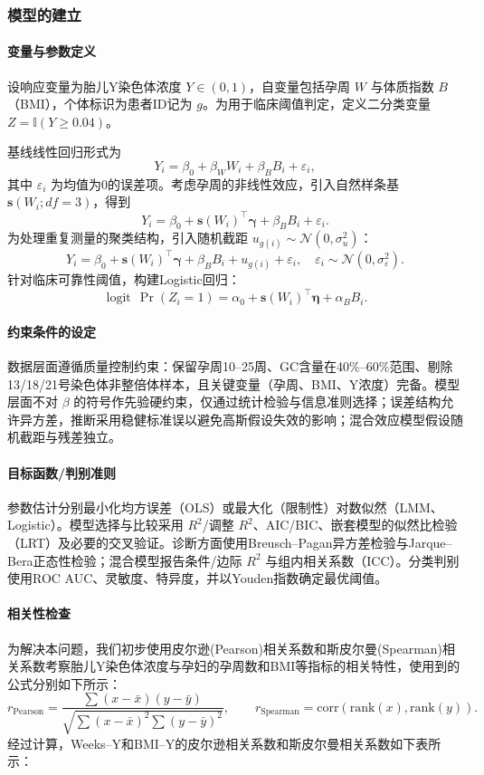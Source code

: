 \documentclass[withoutpreface]{cumcmthesis}
\begin{document}
\subsubsection{模型的建立}
\paragraph{变量与参数定义}
设响应变量为胎儿Y染色体浓度 $Y\in(0,1)$，自变量包括孕周 $W$ 与体质指数 $B$（BMI），个体标识为患者ID记为 $g$。为用于临床阈值判定，定义二分类变量 $Z=\mathbb{I}(Y\ge 0.04)$。

基线线性回归形式为
\[
Y_i=\beta_0+\beta_W W_i+\beta_B B_i+\varepsilon_i,
\]
其中 $\varepsilon_i$ 为均值为0的误差项。考虑孕周的非线性效应，引入自然样条基 $\mathbf{s}(W_i;df=3)$，得到
\[
Y_i=\beta_0+\mathbf{s}(W_i)^\top\boldsymbol{\gamma}+\beta_B B_i+\varepsilon_i.
\]
为处理重复测量的聚类结构，引入随机截距 $u_{g(i)}\sim\mathcal{N}(0,\sigma_u^2)$：
\[
Y_i=\beta_0+\mathbf{s}(W_i)^\top\boldsymbol{\gamma}+\beta_B B_i+u_{g(i)}+\varepsilon_i,\quad \varepsilon_i\sim\mathcal{N}(0,\sigma_\varepsilon^2).
\]
针对临床可靠性阈值，构建Logistic回归：
\[
\operatorname{logit}\,\Pr(Z_i=1)=\alpha_0+\mathbf{s}(W_i)^\top\boldsymbol{\eta}+\alpha_B B_i.
\]
\paragraph{约束条件的设定}
数据层面遵循质量控制约束：保留孕周10–25周、GC含量在40\%–60\%范围、剔除13/18/21号染色体非整倍体样本，且关键变量（孕周、BMI、Y浓度）完备。模型层面不对 $\beta$ 的符号作先验硬约束，仅通过统计检验与信息准则选择；误差结构允许异方差，推断采用稳健标准误以避免高斯假设失效的影响；混合效应模型假设随机截距与残差独立。
\paragraph{目标函数/判别准则}
参数估计分别最小化均方误差（OLS）或最大化（限制性）对数似然（LMM、Logistic）。模型选择与比较采用 $R^2$/调整 $R^2$、AIC/BIC、嵌套模型的似然比检验（LRT）及必要的交叉验证。诊断方面使用Breusch–Pagan异方差检验与Jarque–Bera正态性检验；混合模型报告条件/边际 $R^2$ 与组内相关系数（ICC）。分类判别使用ROC AUC、灵敏度、特异度，并以Youden指数确定最优阈值。
\paragraph{相关性检查}
为解决本问题，我们初步使用皮尔逊(Pearson)相关系数和斯皮尔曼(Spearman)相关系数考察胎儿Y染色体浓度与孕妇的孕周数和BMI等指标的相关特性，使用到的公式分别如下所示：
$$
r_{\text{Pearson}}=\frac{\sum (x-\bar x)(y-\bar y)}{\sqrt{\sum(x-\bar x)^2\sum(y-\bar y)^2}},\qquad
r_{\text{Spearman}}=\text{corr}(\text{rank}(x),\text{rank}(y)).
$$
经过计算，Weeks–Y和BMI–Y的皮尔逊相关系数和斯皮尔曼相关系数如下表所示：
\end{document}
